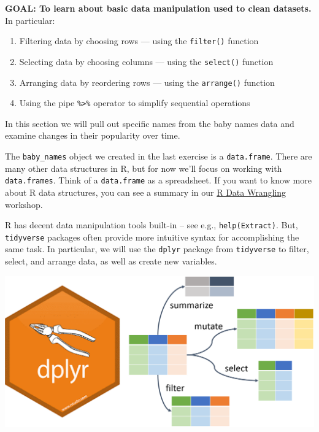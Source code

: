 \documentclass[
]{book}
\providecommand{\tightlist}{%
  \setlength{\itemsep}{0pt}\setlength{\parskip}{0pt}}
\begin{document}
\begin{alert}

\textbf{GOAL: To learn about basic data manipulation used to clean datasets.} In particular:

\begin{enumerate}
\def\labelenumi{\arabic{enumi}.}
\tightlist
\item
  Filtering data by choosing rows --- using the \texttt{filter()} function
\item
  Selecting data by choosing columns --- using the \texttt{select()} function
\item
  Arranging data by reordering rows --- using the \texttt{arrange()} function
\item
  Using the pipe \texttt{\%\textgreater{}\%} operator to simplify sequential operations
\end{enumerate}

\end{alert}

In this section we will pull out specific names from the baby names data and examine changes in their popularity over time.

The \texttt{baby\_names} object we created in the last exercise is a \texttt{data.frame}. There are many other data structures in R, but for now we'll focus on working with \texttt{data.frames}. Think of a \texttt{data.frame} as a spreadsheet. If you want to know more about R data structures, you can see a summary in our \href{./RDataWrangling.html\#data-types-and-structures}{R Data Wrangling} workshop.

R has decent data manipulation tools built-in -- see e.g., \texttt{help(Extract)}. But, \texttt{tidyverse} packages often provide more intuitive syntax for accomplishing the same task. In particular, we will use the \texttt{dplyr} package from \texttt{tidyverse} to filter, select, and arrange data, as well as create new variables.

\includegraphics{R/Rintro/images/dplyr.png}
\end{document}
